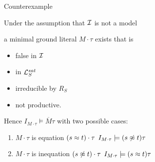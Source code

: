 \documentclass[%
handout,
]{beamer}
\begin{document}
\begin{frame}[allowframebreaks]{Counterexample}








\framebreak
        Under the assumption that $\mathcal{I}$ is not a model

        a minimal ground literal $M\cdot\tau$ exists that is
    \begin{itemize}
        \item false in $\mathcal{I}$
        \item in $\mathcal{L}_S^{sat}$
        \item irreducible by $R_S$
        \item not productive.
    \end{itemize}
    \vspace{1em}

    Hence $I_{M\cdot\tau}\models\overline{M}\tau$
    with two possible cases:

    \begin{enumerate}
        \item $M\cdot\tau$ is equation $(s\approx t)\cdot\tau$  \hfill $I_{M\cdot\tau}\models (s\not\approx t)\tau$
        \item $M\cdot\tau$ is inequation $(s\not\approx t)\cdot\tau$ \hfill $I_{M\cdot\tau}\models (s\approx t)\tau$
    \end{enumerate}


\end{frame}
\end{document}
